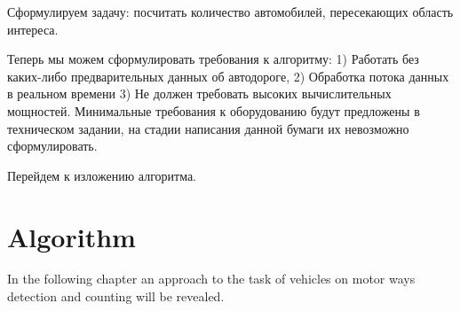 \documentclass[12pt,a4paper,oneside,titlepage]{article}
\begin{document}
Сформулируем задачу: посчитать количество автомобилей, пересекающих область интереса.

Теперь мы можем сформулировать требования к алгоритму:
1) Работать без каких-либо предварительных данных об автодороге,
2) Обработка потока данных в реальном времени
3) Не должен требовать высоких вычислительных мощностей. Минимальные требования к оборудованию будут предложены в техническом задании, на стадии написания данной бумаги их невозможно сформулировать.


Перейдем к изложению алгоритма.





























\newpage
\section{Algorithm}



In the following chapter an approach to the task of vehicles on motor ways detection and counting will be revealed.
\end{document}
